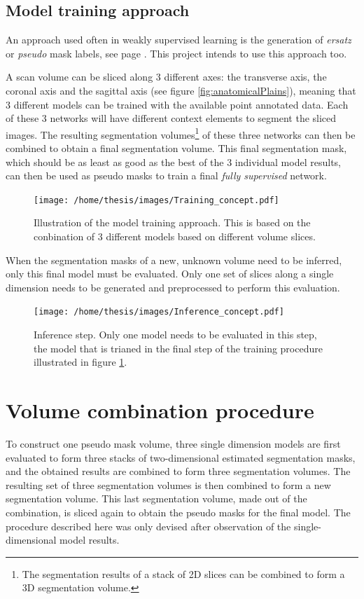\subsection{Model training approach}

An approach used often in weakly supervised learning is the generation of \textit{ersatz} or \textit{pseudo} mask labels\cite{Laradji2019,Laradji2019a, Ahn2019,McEver2020}, see page \pageref{sec:PreviousWork_weaklySupervised}.
This project intends to use this approach too.

A scan volume can be sliced along 3 different axes: the transverse axis, the coronal axis and the sagittal axis (see figure \ref{fig:anatomicalPlains}), meaning that 3 different models can be trained with the available point annotated data. 
Each of these 3 networks will have different context elements to segment the sliced images.
The resulting segmentation volumes\footnote{The segmentation results of a stack of 2D slices can be combined to form a 3D segmentation volume.} of these three networks can then be combined to obtain a final segmentation volume.
This final segmentation mask, which should be as least as good as the best of the 3 individual model results, can then be used as pseudo masks to train a final \textit{fully supervised} network. 

\begin{figure}
    \centering
    \texttt{[image: /home/thesis/images/Training\_concept.pdf]}
    \caption{\label{fig:model_training_concept}Illustration of the model training approach. 
    This is based on the conbination of 3 different models based on different volume slices.}
\end{figure}

When the segmentation masks of a new, unknown volume need to be inferred, only this final model must be evaluated.
Only one set of slices along a single dimension needs to be generated and preprocessed to perform this evaluation.

\begin{figure}
    \centering
    \texttt{[image: /home/thesis/images/Inference\_concept.pdf]}
    \caption{Inference step. Only one model needs to be evaluated in this step, the model that is trianed in the final step of the training procedure illustrated in figure \ref{fig:model_training_concept}.}
\end{figure}

\section{Volume combination procedure\label{sec:combinationProcedure}}
To construct one pseudo mask volume, three single dimension models are first evaluated to form three stacks of two-dimensional estimated segmentation masks, and the obtained results are combined to form three segmentation volumes. 
The resulting set of three segmentation volumes is then combined to form a new segmentation volume.
This last segmentation volume, made out of the combination, is sliced again to obtain the pseudo masks for the final model.
The procedure described here was only devised after observation of the single-dimensional model results.

